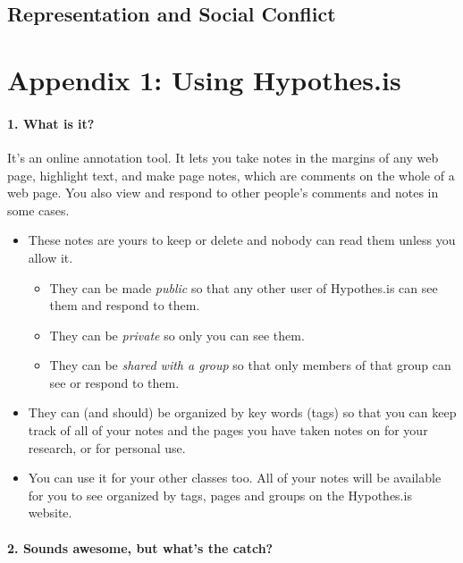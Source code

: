 \documentclass[
  12pt, openany]{book}
\providecommand{\tightlist}{%
  \setlength{\itemsep}{0pt}\setlength{\parskip}{0pt}}
\begin{document}
\hypertarget{representation-and-social-conflict}{%
\section{Representation and Social Conflict}\label{representation-and-social-conflict}}

\hypertarget{appendix-1}{%
\chapter*{Appendix 1: Using Hypothes.is}\label{appendix-1}}


\hypertarget{what-is-it}{%
\subsubsection*{1. What is it?}\label{what-is-it}}


It's an online annotation tool. It lets you take notes in the margins of any web page, highlight text, and make page notes, which are comments on the whole of a web page. You also view and respond to other people's comments and notes in some cases.

\begin{itemize}
\item
  These notes are yours to keep or delete and nobody can read them unless you allow it.

  \begin{itemize}
  \tightlist
  \item
    They can be made \emph{public} so that any other user of Hypothes.is can see them and respond to them.
  \item
    They can be \emph{private} so only you can see them.
  \item
    They can be \emph{shared with a group} so that only members of that group can see or respond to them.
  \end{itemize}
\item
  They can (and should) be organized by key words (tags) so that you can keep track of all of your notes and the pages you have taken notes on for your research, or for personal use.
\item
  You can use it for your other classes too. All of your notes will be available for you to see organized by tags, pages and groups on the Hypothes.is website.
\end{itemize}

\hypertarget{sounds-awesome-but-whats-the-catch}{%
\subsubsection*{2. Sounds awesome, but what's the catch?}\label{sounds-awesome-but-whats-the-catch}}
\end{document}

